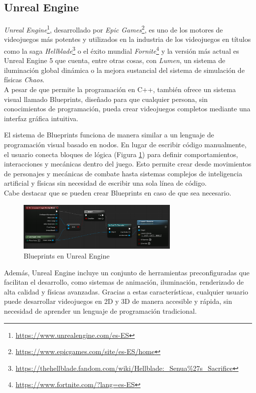 \subsection{Unreal Engine}
\textit{Unreal Engine}\footnote{\url{https://www.unrealengine.com/es-ES}}, desarrollado por \textit{Epic Games}\footnote{\url{https://www.epicgames.com/site/es-ES/home}}, es uno de los motores de videojuegos más potentes y utilizados en la industria de los videojuegos en títulos como la saga \textit{Hellblade}\footnote{\url{https://thehellblade.fandom.com/wiki/Hellblade:_Senua\%27s_Sacrifice}} o el éxito mundial \textit{Fornite}\footnote{\url{https://www.fortnite.com/?lang=es-ES}} y la versión más actual es Unreal Engine 5 que cuenta, entre otras cosas, con \textit{Lumen}, un sistema de iluminación global dinámica o la mejora sustancial del sistema de simulación de físicas \textit{Chaos}.\\
A pesar de que permite la programación en C++, también ofrece un sistema visual llamado Blueprints, diseñado para que cualquier persona, sin conocimientos de programación, pueda crear videojuegos completos mediante una interfaz gráfica intuitiva.

El sistema de Blueprints funciona de manera similar a un lenguaje de programación visual basado en nodos. En lugar de escribir código manualmente, el usuario conecta bloques de lógica (Figura \ref{fig:BluePrints_Figure}) para definir comportamientos, interacciones y mecánicas dentro del juego. Esto permite crear desde movimientos de personajes y mecánicas de combate hasta sistemas complejos de inteligencia artificial y físicas sin necesidad de escribir una sola línea de código.\\
Cabe destacar que se pueden crear Blueprints en caso de que sea necesario.
\begin{figure}[t]
	\centering
	\includegraphics[width = 0.7\textwidth]{Imagenes/Blueprints.png}
	\caption{Blueprints en Unreal Engine}
	\label{fig:BluePrints_Figure}
\end{figure}

Además, Unreal Engine incluye un conjunto de herramientas preconfiguradas que facilitan el desarrollo, como sistemas de animación, iluminación, renderizado de alta calidad y físicas avanzadas. Gracias a estas características, cualquier usuario puede desarrollar videojuegos en 2D y 3D de manera accesible y rápida, sin necesidad de aprender un lenguaje de programación tradicional.

